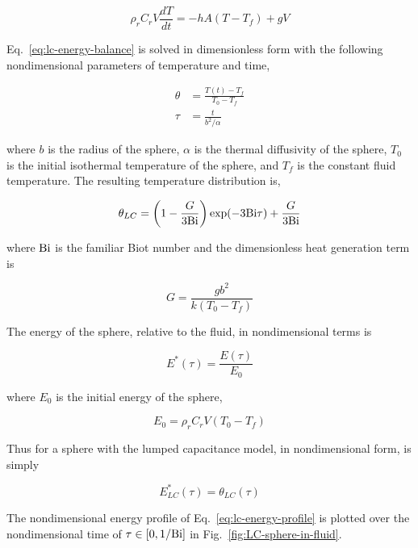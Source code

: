 \begin{equation}\label{eq:lc-energy-balance}
	\rho_rC_rV\frac{dT}{dt} = -hA(T-T_f) + gV
\end{equation}

Eq.~\ref{eq:lc-energy-balance} is solved in dimensionless form with the following nondimensional parameters of temperature and time,

\begin{align}
    \theta &= \frac{T(t) - T_f}{T_0 - T_f}\\
    \tau & = \frac{t}{b^2/\alpha}
\end{align}

where $b$ is the radius of the sphere, $\alpha$ is the thermal diffusivity of the sphere, $T_0$ is the initial isothermal temperature of the sphere, and $T_f$ is the constant fluid temperature. The resulting temperature distribution is,

\begin{equation}
\label{eq:theta-lc}
	\theta_{LC}=\left(1-\frac{G}{3\mathrm{Bi}}\right)\exp(-3\mathrm{Bi} \tau) + \frac{G}{3\mathrm{Bi}}
\end{equation}

where $\mathrm{Bi}$ is the familiar Biot number and the dimensionless heat generation term is 

\begin{equation}\label{eq:nondimensional-heat-generation}
	G = \frac{gb^2}{k(T_0 - T_f)}
\end{equation}

The energy of the sphere, relative to the fluid, in nondimensional terms is 

\begin{equation}
    E^*(\tau)=\frac{E(\tau)}{E_0}
\end{equation}

where $E_0$ is the initial energy of the sphere,

\begin{equation}
    E_0=\rho_rC_rV(T_0-T_f)
\end{equation}

Thus for a sphere with the lumped capacitance model, in nondimensional form, is simply

\begin{equation}\label{eq:lc-energy-profile}
	E^*_{LC}(\tau) = \theta_{LC}(\tau)
\end{equation}

The nondimensional energy profile of Eq.~\ref{eq:lc-energy-profile} is plotted over the nondimensional time of $\tau \in [0,1/\mathrm{Bi}]$ in Fig.~\ref{fig:LC-sphere-in-fluid}. 

